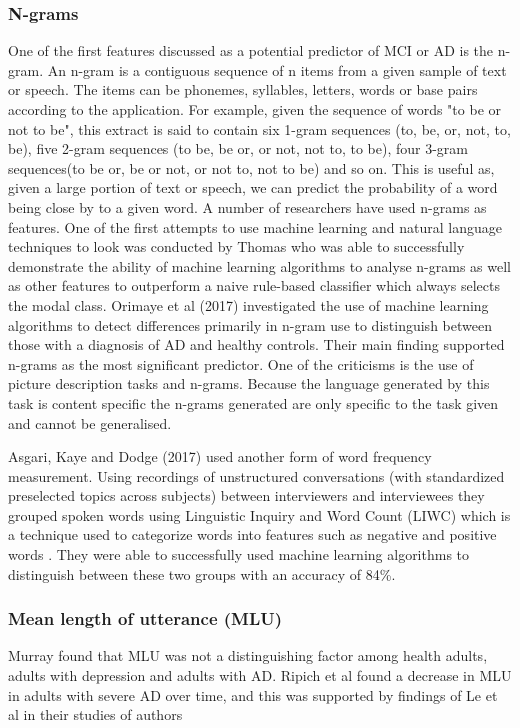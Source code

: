 \documentclass{article}
\begin{document}
\subsubsection{N-grams}
One of the first features discussed as a potential predictor of MCI or AD is the n-gram. An n-gram is a contiguous sequence of n items from a given sample of text or speech. The items can be phonemes, syllables, letters, words or base pairs according to the application. For example, given the sequence of words "to be or not to be", this extract is said to contain six 1-gram sequences (to, be, or, not, to, be), five 2-gram sequences (to be, be or, or not, not to, to be), four 3-gram sequences(to be or, be or not, or not to, not to be) and so on. This is useful as, given a large portion of text or speech, we can predict the probability of a word being close by to a given word. A number of researchers have used n-grams as features. One of the first attempts to use machine learning and natural language techniques to look was conducted by Thomas \cite{Thomas2005} who was able to successfully demonstrate the ability of machine learning algorithms to analyse n-grams as well as other features to outperform a naive rule-based classifier which always selects the modal class. Orimaye et al (2017) \cite{Orimaye2017} investigated the use of machine learning algorithms to detect differences primarily in n-gram use to distinguish between those with a diagnosis of AD and healthy controls. Their main finding supported n-grams as the most significant predictor. One of the criticisms is the use of picture description tasks and n-grams. Because the language generated by this task is content specific the n-grams generated are only specific to the task given and cannot be generalised. \newline
\par
Asgari, Kaye and Dodge (2017) \cite{Asgari2017} used another form of word frequency measurement. Using recordings of unstructured conversations (with standardized preselected topics across subjects) between interviewers and interviewees they grouped spoken words using Linguistic Inquiry and Word Count (LIWC) which is a technique used to categorize words into features such as negative and positive words \cite{Pennebaker2015}. They were able to successfully used machine learning algorithms to distinguish between these two groups with an accuracy of 84\%. \newline
\par
\subsubsection{Mean length of utterance (MLU)}
Murray found that MLU was not a distinguishing factor among health adults, adults with depression and adults with AD. Ripich et al found a decrease in MLU in adults with severe AD over time, and this was supported by findings of Le et al in their studies of authors \cite{Le2012} \newline
\par
\end{document}
